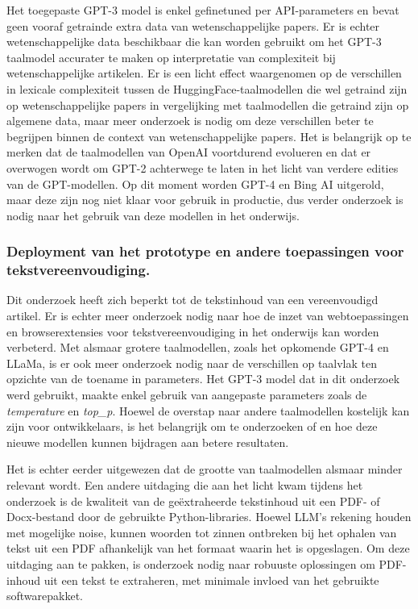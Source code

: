Het toegepaste GPT-3 model is enkel gefinetuned per API-parameters en bevat geen vooraf getrainde extra data van wetenschappelijke papers. Er is echter wetenschappelijke data beschikbaar die kan worden gebruikt om het GPT-3 taalmodel accurater te maken op interpretatie van complexiteit bij wetenschappelijke artikelen. Er is een licht effect waargenomen op de verschillen in lexicale complexiteit tussen de HuggingFace-taalmodellen die wel getraind zijn op wetenschappelijke papers in vergelijking met taalmodellen die getraind zijn op algemene data, maar meer onderzoek is nodig om deze verschillen beter te begrijpen binnen de context van wetenschappelijke papers. Het is belangrijk op te merken dat de taalmodellen van OpenAI voortdurend evolueren en dat er overwogen wordt om GPT-2 achterwege te laten in het licht van verdere edities van de GPT-modellen. Op dit moment worden GPT-4 en Bing AI uitgerold, maar deze zijn nog niet klaar voor gebruik in productie, dus verder onderzoek is nodig naar het gebruik van deze modellen in het onderwijs.

\subsubsection{Deployment van het prototype en andere toepassingen voor tekstvereenvoudiging.}

Dit onderzoek heeft zich beperkt tot de tekstinhoud van een vereenvoudigd artikel. Er is echter meer onderzoek nodig naar hoe de inzet van webtoepassingen en browserextensies voor tekstvereenvoudiging in het onderwijs kan worden verbeterd. Met alsmaar grotere taalmodellen, zoals het opkomende GPT-4 en LLaMa, is er ook meer onderzoek nodig naar de verschillen op taalvlak ten opzichte van de toename in parameters. Het GPT-3 model dat in dit onderzoek werd gebruikt, maakte enkel gebruik van aangepaste parameters zoals de \textit{temperature} en \textit{top\_p}. Hoewel de overstap naar andere taalmodellen kostelijk kan zijn voor ontwikkelaars, is het belangrijk om te onderzoeken of en hoe deze nieuwe modellen kunnen bijdragen aan betere resultaten. 

\medskip

Het is echter eerder uitgewezen dat de grootte van taalmodellen alsmaar minder relevant wordt. Een andere uitdaging die aan het licht kwam tijdens het onderzoek is de kwaliteit van de geëxtraheerde tekstinhoud uit een PDF- of Docx-bestand door de gebruikte Python-libraries. Hoewel LLM's rekening houden met mogelijke noise, kunnen woorden tot zinnen ontbreken bij het ophalen van tekst uit een PDF afhankelijk van het formaat waarin het is opgeslagen. Om deze uitdaging aan te pakken, is onderzoek nodig naar robuuste oplossingen om PDF-inhoud uit een tekst te extraheren, met minimale invloed van het gebruikte softwarepakket.